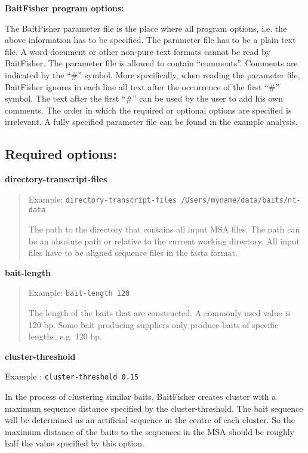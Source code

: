 \documentclass[a4paper,pdflatex,11pt]{article}
\begin{document}
\textbf{BaitFisher program options:}

The BaitFisher parameter file is the place where all program options,
i.e. the above information has to be specified. The parameter file has
to be a plain text file. A word document or other non-pure text formats
cannot be read by BaitFisher. The parameter file is allowed to contain
``comments''. Comments are indicated by the ``\#'' symbol. More
specifically, when reading the parameter file, BaitFisher ignores in
each line all text after the occurrence of the first ``\#'' symbol. The
text after the first ``\#'' can be used by the user to add his own
comments. The order in which the required or optional options are
specified is irrelevant. A fully specified parameter file can be found
in the example analysis.

\subsection{Required options:}

\textbf{directory-transcript-files}

\begin{quote}
Example: \verb+directory-transcript-files /Users/myname/data/baits/nt-data+

The path to the directory that contains all input MSA files. The path
can be an absolute path or relative to the current working directory. All input
files have to be aligned sequence files in the fasta format.
\end{quote}

\textbf{bait-length}

\begin{quote}
Example: \verb+bait-length 120+

The length of the baits that are constructed. A commonly used value is
120 bp. Some bait producing suppliers only produce baits of specific
lengths, e.g. 120 bp.
\end{quote}

\textbf{cluster-threshold}

Example : \verb+cluster-threshold 0.15+

In the process of clustering similar baits, BaitFisher creates cluster
with a maximum sequence distance specified by the cluster-threshold. The
bait sequence will be determined as an artificial sequence in the centre
of each cluster. So the maximum distance of the baits to the sequences
in the MSA should be roughly half the value specified by this option.
\end{document}
